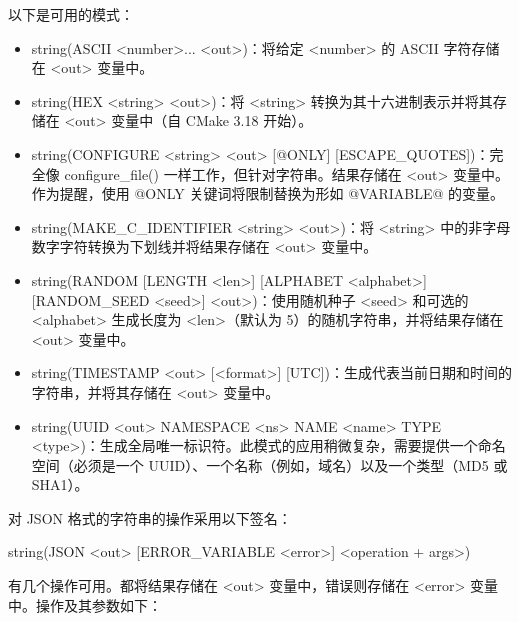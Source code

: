 
以下是可用的模式：

\begin{itemize}
\item
string(ASCII <number>... <out>)：将给定 <number> 的 ASCII 字符存储在 <out> 变量中。

\item
string(HEX <string> <out>)：将 <string> 转换为其十六进制表示并将其存储在 <out> 变量中（自 CMake 3.18 开始）。

\item
string(CONFIGURE <string> <out> [@ONLY] [ESCAPE\_QUOTES])：完全像 configure\_file() 一样工作，但针对字符串。结果存储在 <out> 变量中。作为提醒，使用 @ONLY 关键词将限制替换为形如 @VARIABLE@ 的变量。

\item
string(MAKE\_C\_IDENTIFIER <string> <out>)：将 <string> 中的非字母数字字符转换为下划线并将结果存储在 <out> 变量中。

\item
string(RANDOM [LENGTH <len>] [ALPHABET <alphabet>] [RANDOM\_SEED <seed>] <out>)：使用随机种子 <seed> 和可选的 <alphabet> 生成长度为 <len>（默认为 5）的随机字符串，并将结果存储在 <out> 变量中。

\item
string(TIMESTAMP <out> [<format>] [UTC])：生成代表当前日期和时间的字符串，并将其存储在 <out> 变量中。

\item
string(UUID <out> NAMESPACE <ns> NAME <name> TYPE <type>)：生成全局唯一标识符。此模式的应用稍微复杂，需要提供一个命名空间（必须是一个 UUID）、一个名称（例如，域名）以及一个类型（MD5 或 SHA1）。
\end{itemize}


对 JSON 格式的字符串的操作采用以下签名：

\begin{cmake}
string(JSON <out> [ERROR_VARIABLE <error>] <operation + args>)
\end{cmake}

有几个操作可用。都将结果存储在 <out> 变量中，错误则存储在 <error> 变量中。操作及其参数如下：

